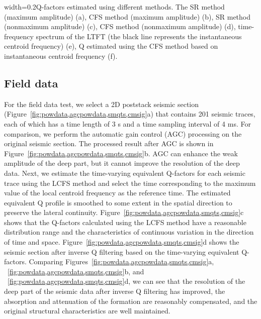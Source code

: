              {width=0.2\columnwidth}{Q-factors estimated using different
              methods. The SR method (maximum amplitude) (a), CFS method
              (maximum amplitude) (b), SR method (nonmaximum amplitude) (c),
              CFS method (nonmaximum amplitude) (d), time-frequency spectrum
              of the LTFT (the black line represents the instantaneous
              centroid frequency) (e), Q estimated using the CFS method based
              on instantaneous centroid frequency (f).}

\subsection{Field data}

For the field data test, we select a 2D poststack seismic section
(Figure~\ref{fig:powdata,agcpowdata,smqts,cmsig}a) that contains 201
seismic traces, each of which has a time length of 3 s and a time
sampling interval of 4 ms. For comparison, we perform the automatic
gain control (AGC) processing on the original seismic section. The
processed result after AGC is shown in
Figure~\ref{fig:powdata,agcpowdata,smqts,cmsig}b. AGC can enhance the
weak amplitude of the deep part, but it cannot improve the resolution
of the deep data. Next, we estimate the time-varying equivalent
Q-factors for each seismic trace using the LCFS method and select the
time corresponding to the maximum value of the local centroid
frequency as the reference time. The estimated equivalent Q profile is
smoothed to some extent in the spatial direction to preserve the
lateral continuity.  Figure~\ref{fig:powdata,agcpowdata,smqts,cmsig}c
shows that the Q-factors calculated using the LCFS method have a
reasonable distribution range and the characteristics of continuous
variation in the direction of time and
space. Figure~\ref{fig:powdata,agcpowdata,smqts,cmsig}d shows the
seismic section after inverse Q filtering based on the time-varying
equivalent Q-factors. Comparing
Figures~\ref{fig:powdata,agcpowdata,smqts,cmsig}a,
~\ref{fig:powdata,agcpowdata,smqts,cmsig}b, and
~\ref{fig:powdata,agcpowdata,smqts,cmsig}d, we can see that the
resolution of the deep part of the seismic data after inverse Q
filtering has improved, the absorption and attenuation of the
formation are reasonably compensated, and the original structural
characteristics are well maintained.
          
